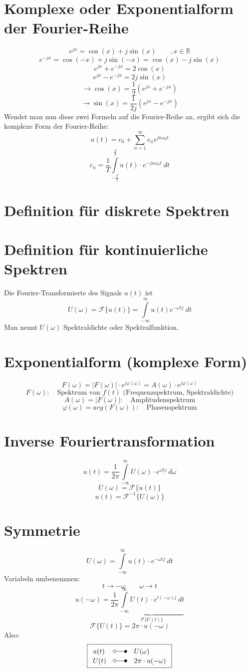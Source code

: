 \section{Komplexe oder Exponentialform der Fourier-Reihe}
\[ e^{j x} = \cos(x) + j \sin(x) \qquad , x \in \mathbb{R} \]
\[ e^{- j x} = \cos(-x) + j \sin(-x) = \cos(x) - j \sin(x) \]
\[ e^{jx} + e^{-jx} = 2 \cos(x) \]
\[ e^{jx} - e^{-jx} = 2 j \sin(x) \]
\[ \to \cos(x) = \frac{1}{2} (e^{jx} + e^{-jx}) \]
\[ \to \sin(x) = \frac{1}{2j} (e^{jx} - e^{-jx}) \]
Wendet man nun diese zwei Formeln auf die Fourier-Reihe an, ergibt sich die komplexe Form der Fourier-Reihe:
\[ u(t) = c_0 + \sum\limits_{n = 1}^{\infty} c_n e^{j n \omega_0 t} \]
\[ c_n = \frac{1}{T} \int\limits_{-\frac{T}{2}}^{\frac{T}{2}} 
u(t) \cdot e^{-j n \omega_0 t} ~ dt \]


\section{Definition für diskrete Spektren}


\section{Definition für kontinuierliche Spektren}
 Die Fourier-Transformierte des Signals $u(t)$ ist 
\[ U(\omega) = \mathcal{F}\{ u(t) \} = \int\limits_{-\infty}^{\infty} 
u(t) e^{-\omega t j} ~dt \]
Man nennt $U(\omega)$ Spektraldichte oder Spektralfunktion. 

\section{Exponentialform (komplexe Form)}
\[ \boxed{F(\omega) = |F(\omega)| \cdot e^{j\varphi(\omega)} = A(\omega) \cdot e^{j\varphi(\omega)}}   \]
\[ F(\omega): \quad \text{Spektrum von $f(t)$ (Frequenzspektrum, Spektraldichte)} \]
\[ A(\omega) = |F(\omega)|: \quad \text{Amplitudenspektrum} \]
\[ \varphi (\omega) = arg(F(\omega)): \quad \text{Phasenspektrum} \]

\section{Inverse Fouriertransformation}
\[ u(t) = \frac{1}{2 \pi}  \int\limits_{-\infty}^{\infty} U(\omega) \cdot e^{\omega t j} ~ d\omega \]
\[ U(\omega) = \mathcal{F} \{ u(t) \} \]
\[ u(t) = \mathcal{F}^{-1} \{ U(\omega) \} \]

\section{Symmetrie}
\[ U(\omega) = \int\limits_{-\infty}^{\infty} u(t) \cdot e^{-\omega t j} ~ dt \]
Variabeln umbenennnen: 
\[ t \to -\omega \qquad \omega \to t \]
\[ u(-\omega) = \frac{1}{2 \pi} \underbrace{\int\limits_{-\infty}^{\infty} 
U(t) \cdot e^{t (-\omega) j} ~ dt}_{\mathcal{F} \{ U(t) \}} \]
\[ \mathcal{F} \{ U(t) \} = 2 \pi \cdot u(-\omega) \]
Also: 
\[ \boxed{\begin{array}{lll}
u(t) & \laplace & U(\omega)\\
U(t) & \laplace & 2 \pi \cdot u(-\omega)
\end{array}} \]


